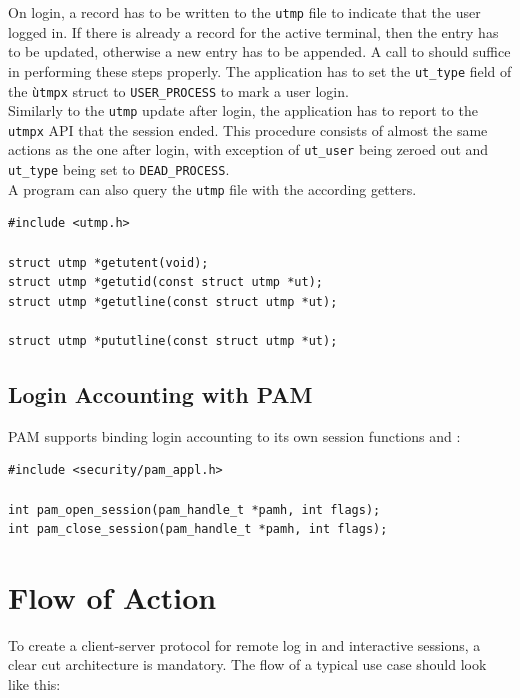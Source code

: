 \documentclass[10pt,a4paper,titlepage,twoside,english,final]{zhawreprt}
\begin{document}
On login, a record has to be written to the \texttt{utmp} file to indicate that the user logged in. If there is already a record for the active terminal, then the entry has to be updated, otherwise a new entry has to be appended. A call to \cite{pututxline} should suffice in performing these steps properly. The application has to set the \texttt{ut\_type} field of the \texttt{ùtmpx} struct to \texttt{USER\_PROCESS} to mark a user login.\\
Similarly to the \texttt{utmp} update after login, the application has to report to the \texttt{utmpx} \gls{API} that the session ended. This procedure consists of almost the same actions as the one after login, with exception of \texttt{ut\_user} being zeroed out and \texttt{ut\_type} being set to \texttt{DEAD\_PROCESS}\citep[p.828]{KerriskTLPI}.\\
A program can also query the \texttt{utmp} file with the according getters.
\setlistingC
\begin{lstlisting}[caption={\texttt{utmpx} \gls{API} functions},label=lst:UtmpxApiFunctions]
#include <utmp.h>

struct utmp *getutent(void);
struct utmp *getutid(const struct utmp *ut);
struct utmp *getutline(const struct utmp *ut);

struct utmp *pututline(const struct utmp *ut);
\end{lstlisting}

\subsection{Login Accounting with PAM}\label{ssec:LoginAccountingWithPAM}
\gls{PAM} supports binding login accounting to its own session functions \cite{pam_open_session} and \cite{pam_close_session}:
\setlistingC
\begin{lstlisting}[caption={\gls{PAM} session management},label=lst:PAMSessionManagement]
#include <security/pam_appl.h>

int pam_open_session(pam_handle_t *pamh, int flags);
int pam_close_session(pam_handle_t *pamh, int flags);
\end{lstlisting}

\section{Flow of Action}\label{sec:FlowOfAction}
To create a client-server protocol for remote log in and interactive sessions, a clear cut architecture is mandatory. The flow of a typical use case should look like this:
\end{document}
